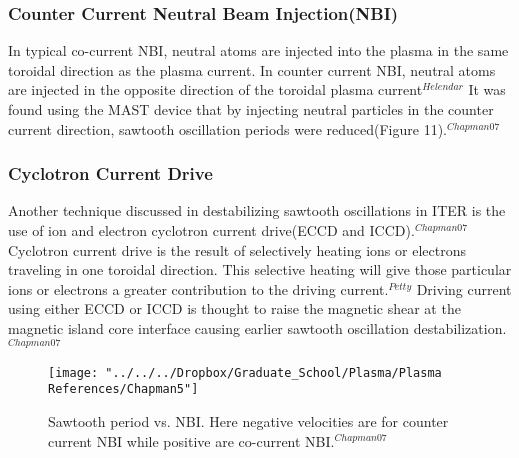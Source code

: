 \documentclass{article}
\begin{document}
\subsubsection{Counter Current Neutral Beam Injection(NBI)}
In typical co-current NBI, neutral atoms are injected into the plasma in the same toroidal direction as the plasma current.  In counter current NBI, neutral atoms are injected in the opposite direction of the toroidal plasma current$^{Helendar}$  It was found using the MAST device that by injecting neutral particles in the counter current direction, sawtooth oscillation periods were reduced(Figure 11).$^{Chapman07}$
\subsubsection{Cyclotron Current Drive}
Another technique discussed in destabilizing sawtooth oscillations in ITER is the use of ion and electron cyclotron current drive(ECCD and ICCD).$^{Chapman07}$  Cyclotron current drive is the result of selectively heating ions or electrons traveling in one toroidal direction.  This selective heating will give those particular ions or electrons a greater contribution to the driving current.$^{Petty}$  Driving current using either ECCD or ICCD is thought to raise the magnetic shear at the magnetic island core interface causing earlier sawtooth oscillation destabilization.$^{Chapman07}$
\begin{figure}
\centering
\texttt{[image: "../../../Dropbox/Graduate\_School/Plasma/Plasma References/Chapman5"]}
\caption{Sawtooth period vs. NBI. Here negative velocities are for counter current NBI while positive are co-current NBI.$^{Chapman07}$}
\label{fig:Chapman5}
\end{figure}
\newpage
\end{document}
